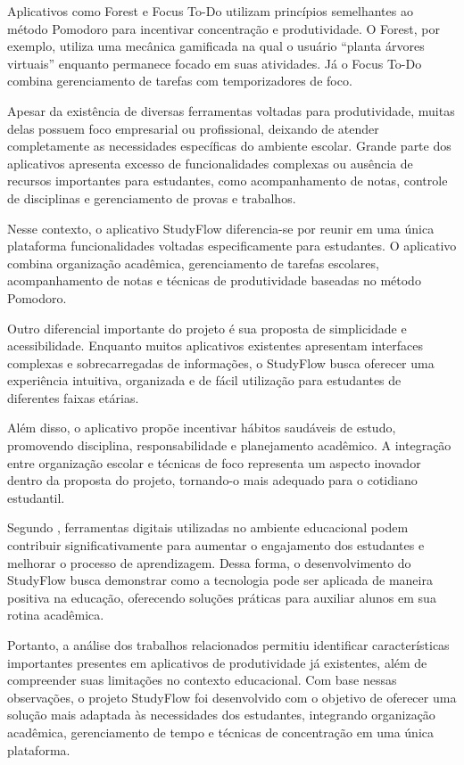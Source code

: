 \documentclass[12pt]{article}
\begin{document}
Aplicativos como Forest e Focus To-Do utilizam princípios semelhantes ao método Pomodoro para incentivar concentração e produtividade. O Forest, por exemplo, utiliza uma mecânica gamificada na qual o usuário “planta árvores virtuais” enquanto permanece focado em suas atividades. Já o Focus To-Do combina gerenciamento de tarefas com temporizadores de foco.

Apesar da existência de diversas ferramentas voltadas para produtividade, muitas delas possuem foco empresarial ou profissional, deixando de atender completamente as necessidades específicas do ambiente escolar. Grande parte dos aplicativos apresenta excesso de funcionalidades complexas ou ausência de recursos importantes para estudantes, como acompanhamento de notas, controle de disciplinas e gerenciamento de provas e trabalhos.

Nesse contexto, o aplicativo StudyFlow diferencia-se por reunir em uma única plataforma funcionalidades voltadas especificamente para estudantes. O aplicativo combina organização acadêmica, gerenciamento de tarefas escolares, acompanhamento de notas e técnicas de produtividade baseadas no método Pomodoro.

Outro diferencial importante do projeto é sua proposta de simplicidade e acessibilidade. Enquanto muitos aplicativos existentes apresentam interfaces complexas e sobrecarregadas de informações, o StudyFlow busca oferecer uma experiência intuitiva, organizada e de fácil utilização para estudantes de diferentes faixas etárias.

Além disso, o aplicativo propõe incentivar hábitos saudáveis de estudo, promovendo disciplina, responsabilidade e planejamento acadêmico. A integração entre organização escolar e técnicas de foco representa um aspecto inovador dentro da proposta do projeto, tornando-o mais adequado para o cotidiano estudantil.

Segundo , ferramentas digitais utilizadas no ambiente educacional podem contribuir significativamente para aumentar o engajamento dos estudantes e melhorar o processo de aprendizagem. Dessa forma, o desenvolvimento do StudyFlow busca demonstrar como a tecnologia pode ser aplicada de maneira positiva na educação, oferecendo soluções práticas para auxiliar alunos em sua rotina acadêmica.

Portanto, a análise dos trabalhos relacionados permitiu identificar características importantes presentes em aplicativos de produtividade já existentes, além de compreender suas limitações no contexto educacional. Com base nessas observações, o projeto StudyFlow foi desenvolvido com o objetivo de oferecer uma solução mais adaptada às necessidades dos estudantes, integrando organização acadêmica, gerenciamento de tempo e técnicas de concentração em uma única plataforma.
\end{document}
